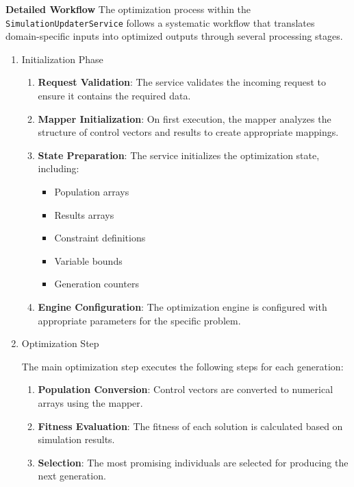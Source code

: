 \bigskip
\textbf{Detailed Workflow}
The optimization process within the \texttt{SimulationUpdaterService} follows a systematic workflow that translates domain-specific inputs into optimized outputs through several processing stages.

\begin{enumerate}
	
\item Initialization Phase

\begin{enumerate}
	\item \textbf{Request Validation}: The service validates the incoming request to ensure it contains the required data.
	
	\item \textbf{Mapper Initialization}: On first execution, the mapper analyzes the structure of control vectors and results to create appropriate mappings.
	
	\item \textbf{State Preparation}: The service initializes the optimization state, including:
	\begin{itemize}
		\item Population arrays
		\item Results arrays
		\item Constraint definitions
		\item Variable bounds
		\item Generation counters
	\end{itemize}
	
	\item \textbf{Engine Configuration}: The optimization engine is configured with appropriate parameters for the specific problem.
\end{enumerate}

\item Optimization Step

The main optimization step executes the following steps for each generation:

\begin{enumerate}
	\item \textbf{Population Conversion}: Control vectors are converted to numerical arrays using the mapper.
	
	\item \textbf{Fitness Evaluation}: The fitness of each solution is calculated based on simulation results.
	
	\item \textbf{Selection}: The most promising individuals are selected for producing the next generation.
	

\end{enumerate}
\end{enumerate}
